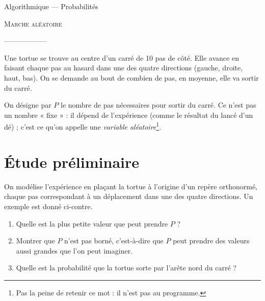 \documentclass[12pt]{article}
\begin{document}
\begin{center}
  Algorithmique --- Probabilités

  {\large
    \textsc{Marche aléatoire}
  }

  ------------------
\end{center}

Une tortue se trouve au centre d'un carré de 10 pas de côté. Elle avance en faisant chaque pas au hasard dans une des quatre directions (gauche, droite, haut, bas). On se demande au bout de combien de pas, en moyenne, elle va sortir du carré.

On désigne par $P$ le nombre de pas nécessaires pour sortir du carré. Ce n'est pas un nombre « fixe » : il dépend de l'expérience (comme le résultat du lancé d'un dé) ; c'est ce qu'on appelle une \emph{variable aléatoire}\footnote{Pas la peine de retenir ce mot : il n'est pas au programme.}.

\section{Étude préliminaire}

\begin{multicols}{2}
On modélise l'expérience en plaçant la tortue à l'origine d'un repère orthonormé, chaque pas correspondant à un déplacement dans une des quatre directions. Un exemple est donné ci-contre.

\begin{enumerate}
  \item Quelle est la plus petite valeur que peut prendre $P$ ?
  \item Montrer que $P$ n'est pas borné, c'est-à-dire que $P$ peut prendre des valeurs aussi grandes que l'on peut imaginer.
  \item Quelle est la probabilité que la tortue sorte par l'arête nord du carré ?
\end{enumerate}

\columnbreak

\begin{center}
\end{center}
\end{multicols}
\end{document}
